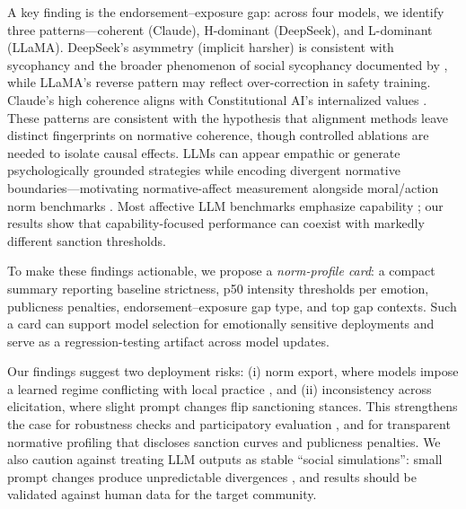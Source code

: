 \documentclass[11pt]{article}
\begin{document}
A key finding is the endorsement--exposure gap: across four models, we identify three patterns---coherent (Claude), H-dominant (DeepSeek), and L-dominant (LLaMA). DeepSeek's asymmetry (implicit harsher) is consistent with sycophancy \citep{sharma-etal-2024-sycophancy,turpin-etal-2024-unfaithful} and the broader phenomenon of social sycophancy documented by \citet{cheng-etal-2025-elephant}, while LLaMA's reverse pattern may reflect over-correction in safety training. Claude's high coherence aligns with Constitutional AI's internalized values \citep{bai-etal-2022-constitutional-ai}.
These patterns are consistent with the hypothesis that alignment methods leave distinct fingerprints on normative coherence, though controlled ablations are needed to isolate causal effects.
LLMs can appear empathic \citep{lee-etal-2024-empathic,huang-etal-2024-apathetic} or generate psychologically grounded strategies \citep{zhan-etal-2024-reappraisal} while encoding divergent normative boundaries---motivating normative-affect measurement alongside moral/action norm benchmarks \citep{forbes-etal-2020-social,ziems-etal-2023-normbank,emelin-etal-2021-moral,hendrycks2021ethics,jiang2021delphi,talat2021word}.
Most affective LLM benchmarks emphasize capability \citep{rashkin-etal-2019-towards,demszky-etal-2020-goemotions,chen-etal-2024-emotionqueen,sabour-etal-2024-emobench,paech2023eqbench,zhang-etal-2024-affective-llm-survey,schlegel-etal-2025-ei-tests}; our results show that capability-focused performance can coexist with markedly different sanction thresholds.

To make these findings actionable, we propose a \emph{norm-profile card}: a compact summary reporting baseline strictness, p50 intensity thresholds per emotion, publicness penalties, endorsement--exposure gap type, and top gap contexts. Such a card can support model selection for emotionally sensitive deployments and serve as a regression-testing artifact across model updates.

Our findings suggest two deployment risks: (i) norm export, where models impose a learned regime conflicting with local practice \citep{cummins2024feelingtherules}, and (ii) inconsistency across elicitation, where slight prompt changes flip sanctioning stances.
This strengthens the case for robustness checks and participatory evaluation \citep{zhao-etal-2025-lmc,zheng2023mtbench}, and for transparent normative profiling that discloses sanction curves and publicness penalties.
We also caution against treating LLM outputs as stable ``social simulations'': small prompt changes produce unpredictable divergences \citep{rottger-etal-2024-political,gao-etal-2025-llm-human-surrogates,dominguez-olmedo-etal-2023-questioning-surveys}, and results should be validated against human data for the target community.
\end{document}
